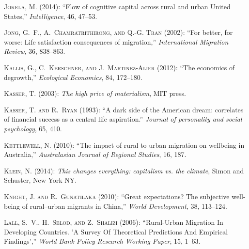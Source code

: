 \documentclass[10pt, letterpaper]{article}
\begin{document}
\begin{spacing}{2.0}
\begin{thebibliography}{115}
\textsc{Jokela, M.} (2014): \enquote{Flow of cognitive capital across rural and
  urban United States,} \emph{Intelligence}, 46, 47--53.

\textsc{Jong, G.~F., A.~Chamratrithirong, and Q.-G. Tran} (2002): \enquote{For
  better, for worse: Life satisfaction consequences of migration,}
  \emph{International Migration Review}, 36, 838--863.

\textsc{Kallis, G., C.~Kerschner, and J.~Martinez-Alier} (2012): \enquote{The
  economics of degrowth,} \emph{Ecological Economics}, 84, 172--180.

\textsc{Kasser, T.} (2003): \emph{The high price of materialism}, MIT press.

\textsc{Kasser, T. and R.~Ryan} (1993): \enquote{A dark side of the American
  dream: correlates of financial success as a central life aspiration.}
  \emph{Journal of personality and social psychology}, 65, 410.

\textsc{Kettlewell, N.} (2010): \enquote{The impact of rural to urban migration
  on wellbeing in Australia,} \emph{Australasian Journal of Regional Studies},
  16, 187.

\textsc{Klein, N.} (2014): \emph{This changes everything: capitalism vs. the
  climate}, Simon and Schuster, New York NY.

\textsc{Knight, J. and R.~Gunatilaka} (2010): \enquote{Great expectations? The
  subjective well-being of rural--urban migrants in China,} \emph{World
  Development}, 38, 113--124.

\textsc{Lall, S.~V., H.~Selod, and Z.~Shalizi} (2006): \enquote{{Rural-Urban
  Migration In Developing Countries. 'A Survey Of Theoretical Predictions And
  Empirical Findings'},} \emph{World Bank Policy Research Working Paper}, 15,
  1--63.


\end{thebibliography}
\end{spacing}
\end{document}
